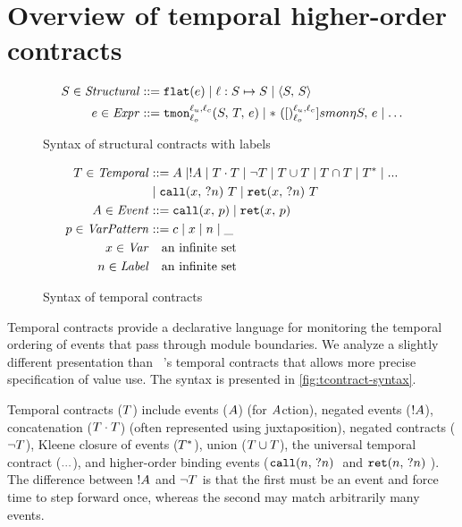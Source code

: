 \documentclass[preprint,onecolumn,9pt]{sigplanconf} %
\begin{document}
\section{Overview of temporal higher-order contracts}

\begin{figure}
  \begin{align*}
    S \in \mathit{Structural} &::= {\tt flat}(e) \mid \ell : S \mapsto S \mid \langle S,\, S\rangle
\\
    e \in \mathit{Expr} &::= {\tt tmon}{^{\ell_u,\ell_c}_{\ell_o}}({S,\,T,\,e})
                    \mid {\tt *}{\ }({[})^{\ell_u,\ell_c}_{\ell_o}]{smon}{\eta}{S,\, e}
                    \mid \ldots
  \end{align*}
  \caption{Syntax of structural contracts with labels}
  \label{fig:scontract-syntax}
\end{figure}

\begin{figure}
  \begin{align*}
 T \in \mathit{Temporal} &::=
      A \mid ! A
 \mid T \cdot T
 \mid \neg T
 \mid T \cup T
 \mid T \cap T
 \mid T^*
 \mid {\tt ...} \\
&\mid {\tt call}(x,\,{\tt ?}n)\ T
 \mid {\tt ret}(x,\,{\tt ?}n)\ T \\
A \in \mathit{Event} &::= {\tt call}(x,\, p) \mid {\tt ret}(x,\, p) \\
p \in \mathit{VarPattern} &::= c \mid x \mid n \mid \_ \\
x \in \mathit{Var} &\quad\text{an infinite set} \\
n \in \mathit{Label} &\quad\text{an infinite set}
  \end{align*}
  \caption{Syntax of temporal contracts}
  \label{fig:tcontract-syntax}
\end{figure}

Temporal contracts provide a declarative language for monitoring the temporal ordering of events that pass through module boundaries.
%
We analyze a slightly different presentation than ~\citep{ianjohnson:dfm:icfp2011}'s temporal contracts that allows more precise specification of value use.
%
The syntax is presented in \autoref{fig:tcontract-syntax}.

Temporal contracts ($T$) include events ($A$) (for $A$ction), negated events ($! A$), concatenation ($T \cdot T$) (often represented using juxtaposition), negated contracts ($\neg T$), Kleene closure of events ($T^*$), union ($T \cup T$), the universal temporal contract (${\tt ...}$), and higher-order binding events ($\stcall{\mname}{\mname}$ and $\stret{\mname}{\mname}$).
%
The difference between $! A$ and $\neg T$ is that the first must be an event and force time to step forward once, whereas the second may match arbitrarily many events.
\end{document}
